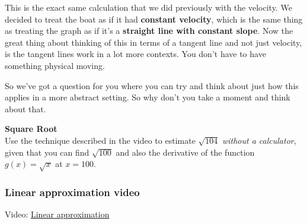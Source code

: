 \documentclass[pdftex, brazil, 12pt, twoside]{article}
\begin{document}
\begin{figure}[H]
  \begin{center}
  \end{center}
\end{figure}

This is the exact same calculation
that we did previously with the velocity.
We decided to treat the boat as if it
had \textbf{constant velocity}, which is the same thing as treating
the graph as if it's a \textbf{straight line with constant slope}.
Now the great thing about thinking
of this in terms of a tangent line and not just velocity,
is the tangent lines work in a lot more contexts.
You don't have to have something physical moving.

So we've got a question for you where you can try and think
about just how this applies in a more abstract setting.
So why don't you take a moment and think about that.

\begin{exercise}
  \textbf{Square Root}\\%
  Use the technique described in the video to estimate $\sqrt{104}$
  \emph{without a calculator}, given that you can find $\sqrt{100}$ and also the derivative
  of the function $g(x) = \sqrt{x}$ at $x=100$.
\end{exercise}

\subsubsection{Linear approximation video}
\label{u2-linear-linear-approximation-video}

Video: \href{https://www.youtube.com/watch?v=0y5VI-G3lHA}{Linear approximation}
\end{document}
